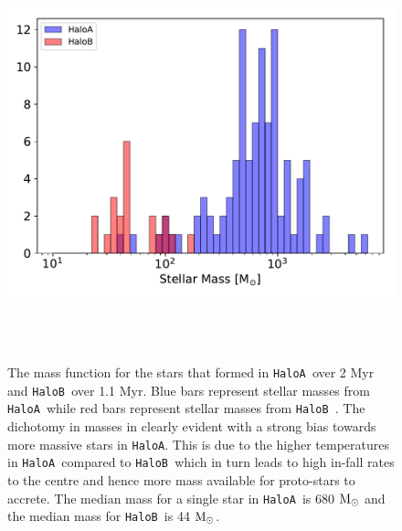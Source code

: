 \documentclass[graphics, twocolumn, usenatbib]{mn2e}
\newcommand{\msolar} {$\rm{M_{\odot}}~$}
\newcommand{\msolarc} {$\rm{M_{\odot}}$}
\newcommand{\ha} {\texttt{HaloA~}}
\newcommand{\hb} {\texttt{HaloB~}}
\newcommand{\hac} {\texttt{HaloA}}
\begin{document}
 
\begin{figure}
\centering
\begin{minipage}{175mm}      \begin{center}
\centerline{
    \includegraphics[width=18.0cm, height=12cm]{FIGURES/FinalMass_MultipleHaloes.pdf}}
\caption{
  The mass function for the stars that formed in \ha over 2 Myr and \hb over 1.1 Myr.
  Blue bars represent stellar masses from \ha while red bars represent stellar masses from \hb.
  The dichotomy in masses in clearly evident with a strong bias towards more massive stars
  in \hac. This is due to the higher temperatures in \ha compared to \hb which in turn
  leads to high in-fall rates to the centre and hence more mass available for proto-stars
  to accrete. The median mass for a single star in \ha is 680 \msolar and the median mass
  for \hb is 44 \msolarc. 
}
\label{Fig:MassFunction}
\end{center} \end{minipage}
\end{figure}
\end{document}

